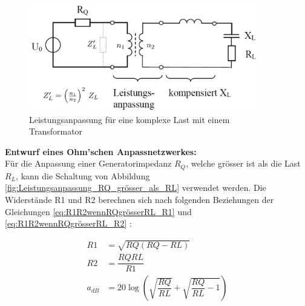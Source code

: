 \begin{figure}[!ht]
	\centering
	\includegraphics[width=10cm]{content/bilder/AnpassungKomplexerLast.pdf}%
	\caption{Leistungsanpassung für eine komplexe Last mit einem Transformator\cite{Tekom}}
	\label{AnpassungKomplexerLast}
\end{figure}
\newpage
\textbf{Entwurf eines Ohm’schen Anpassnetzwerkes:} \\
Für die Anpassung einer Generatorimpedanz $R_Q$, welche grösser ist als die Last $R_L$, kann die Schaltung von Abbildung \ref{fig:Leistungsanpassung_RQ_grösser_als_RL} verwendet werden. Die Widerstände R1 und R2 berechnen sich nach folgenden Beziehungen der Gleichungen \ref{eq:R1R2wennRQgrösserRL_R1} und \ref{eq:R1R2wennRQgrösserRL_R2} \cite{Tekom}:

	\begin{align}
		R1 &= \sqrt{RQ(RQ-RL)} \label{eq:R1R2wennRQgrösserRL_R1} \\
		R2 &= \dfrac{RQ RL}{R1} \label{eq:R1R2wennRQgrösserRL_R2} \\
		a_{dB} &= 20\log \left( \sqrt{\dfrac{RQ}{RL}}+\sqrt{\dfrac{RQ}{RL}-1}\right)
	\end{align}

